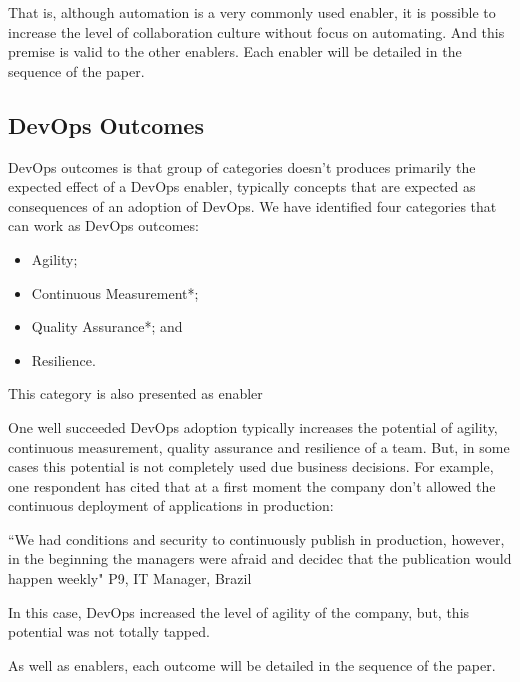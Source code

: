 That is, although automation is a very commonly used enabler, it is possible to
increase the level of collaboration culture without focus on automating. And
this premise is valid to the other enablers. Each enabler will be detailed in
the sequence of the paper.

\subsection{DevOps Outcomes}
DevOps outcomes is that group of categories doesn't produces primarily the
expected effect of a DevOps enabler, typically concepts that are expected as
consequences of an adoption of DevOps. We have identified four categories that
can work as DevOps outcomes:

\begin{itemize}
\item Agility;
\item Continuous Measurement*;
\item Quality Assurance*; and
\item Resilience.
\end{itemize}

\footnotesize * This category is also presented as enabler


\normalsize
One well succeeded DevOps adoption typically increases the potential of
agility, continuous measurement, quality assurance and resilience of a team.
But, in some cases this potential is not completely used due business
decisions. For example, one respondent has cited that at a first moment the
company don't allowed the continuous deployment of applications in production:

``We had conditions and security to continuously publish in production,
however, in the beginning the managers were afraid and decidec that the
publication would happen weekly" P9, IT Manager, Brazil

In this case, DevOps increased the level of agility of the company, but, this
potential was not totally tapped.

As well as enablers, each outcome will be detailed in the sequence of the paper.

